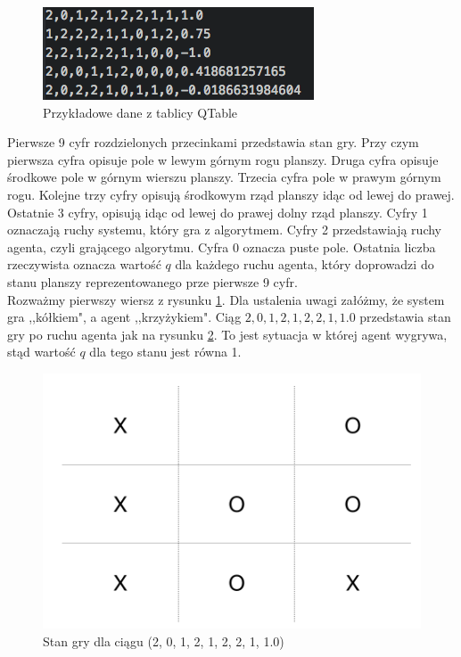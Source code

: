 \documentclass[licencjacka]{pracamgr}
\begin{document}
\begin{figure}[h!]
	\includegraphics [scale=0.8] {QTable_ex.png}
	\caption{Przykładowe dane z tablicy QTable}
	\label{Rys8}
\end{figure}

Pierwsze 9 cyfr rozdzielonych przecinkami przedstawia stan gry. Przy czym pierwsza cyfra opisuje pole w lewym górnym rogu planszy. Druga cyfra opisuje środkowe pole w górnym wierszu planszy. Trzecia cyfra pole w prawym górnym rogu. Kolejne trzy cyfry opisują środkowym rząd planszy idąc od lewej do prawej. Ostatnie 3 cyfry, opisują idąc od lewej do prawej dolny rząd planszy.  Cyfry 1 oznaczają ruchy systemu, który gra z algorytmem. Cyfry 2 przedstawiają ruchy agenta, czyli grającego algorytmu. Cyfra 0 oznacza puste pole. Ostatnia liczba rzeczywista oznacza wartość  $q$ dla każdego ruchu agenta, który doprowadzi do stanu planszy reprezentowanego prze pierwsze 9 cyfr.\\ 

Rozważmy pierwszy wiersz z rysunku \ref{Rys8}. Dla ustalenia uwagi załóżmy, że system gra ,,kółkiem", a agent ,,krzyżykiem". Ciąg $2, 0, 1, 2, 1, 2,  2, 1, 1.0$ przedstawia stan gry po ruchu agenta jak na rysunku \ref{Rys9}. To jest sytuacja w której agent wygrywa, stąd wartość $q$ dla tego stanu jest równa 1. \\

\begin{figure}[h!]
	\includegraphics [scale=0.22] {ttt_1.png}
	\caption{Stan gry dla ciągu (2, 0, 1, 2, 1, 2,  2, 1, 1.0)}
	\label{Rys9}
\end{figure}
\end{document}
